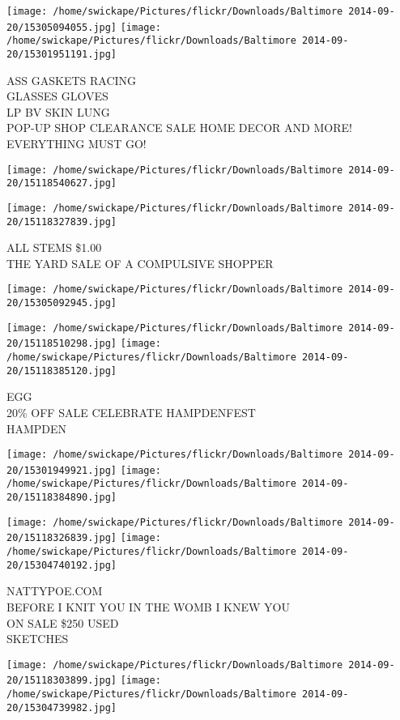 \documentclass[10pt,letterpaper]{article}
\begin{document}
\texttt{[image: /home/swickape/Pictures/flickr/Downloads/Baltimore 2014-09-20/15305094055.jpg]}
\texttt{[image: /home/swickape/Pictures/flickr/Downloads/Baltimore 2014-09-20/15301951191.jpg]}

ASS GASKETS RACING\\
GLASSES GLOVES\\
LP BV SKIN LUNG\\
POP{-}UP SHOP CLEARANCE SALE HOME DECOR AND MORE! EVERYTHING MUST GO!
\pagebreak

\texttt{[image: /home/swickape/Pictures/flickr/Downloads/Baltimore 2014-09-20/15118540627.jpg]}

\vspace{0.25in}
\texttt{[image: /home/swickape/Pictures/flickr/Downloads/Baltimore 2014-09-20/15118327839.jpg]}

ALL STEMS \$1.00\\
THE YARD SALE OF A COMPULSIVE SHOPPER
\pagebreak

\texttt{[image: /home/swickape/Pictures/flickr/Downloads/Baltimore 2014-09-20/15305092945.jpg]}

\vspace{0.25in}
\texttt{[image: /home/swickape/Pictures/flickr/Downloads/Baltimore 2014-09-20/15118510298.jpg]}
\texttt{[image: /home/swickape/Pictures/flickr/Downloads/Baltimore 2014-09-20/15118385120.jpg]}

EGG\\
20\% OFF SALE CELEBRATE HAMPDENFEST\\
HAMPDEN
\pagebreak

\texttt{[image: /home/swickape/Pictures/flickr/Downloads/Baltimore 2014-09-20/15301949921.jpg]}
\texttt{[image: /home/swickape/Pictures/flickr/Downloads/Baltimore 2014-09-20/15118384890.jpg]}

\texttt{[image: /home/swickape/Pictures/flickr/Downloads/Baltimore 2014-09-20/15118326839.jpg]}
\texttt{[image: /home/swickape/Pictures/flickr/Downloads/Baltimore 2014-09-20/15304740192.jpg]}

NATTYPOE.COM\\
BEFORE I KNIT YOU IN THE WOMB I KNEW YOU\\
ON SALE \$250 USED\\
SKETCHES
\pagebreak

\texttt{[image: /home/swickape/Pictures/flickr/Downloads/Baltimore 2014-09-20/15118303899.jpg]}
\texttt{[image: /home/swickape/Pictures/flickr/Downloads/Baltimore 2014-09-20/15304739982.jpg]}
\end{document}
